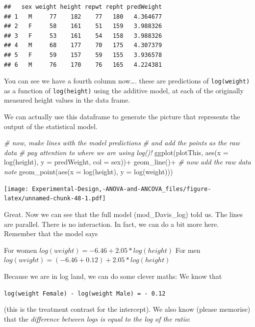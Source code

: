 \documentclass[
]{book}
\newenvironment{Shaded}{\begin{snugshade}}{\end{snugshade}}
\newcommand{\AttributeTok}[1]{\textcolor[rgb]{0.77,0.63,0.00}{#1}}
\newcommand{\CommentTok}[1]{\textcolor[rgb]{0.56,0.35,0.01}{\textit{#1}}}
\newcommand{\FunctionTok}[1]{\textcolor[rgb]{0.00,0.00,0.00}{#1}}
\newcommand{\NormalTok}[1]{#1}
\newcommand{\SpecialCharTok}[1]{\textcolor[rgb]{0.00,0.00,0.00}{#1}}
\begin{document}
\begin{verbatim}
##   sex weight height repwt repht predWeight
## 1   M     77    182    77   180   4.364677
## 2   F     58    161    51   159   3.988326
## 3   F     53    161    54   158   3.988326
## 4   M     68    177    70   175   4.307379
## 5   F     59    157    59   155   3.936578
## 6   M     76    170    76   165   4.224381
\end{verbatim}

You can see we have a fourth column now\ldots. these are predictions of \texttt{log(weight)} as a function of \texttt{log(height)} using the additive model, at each of the originally measured height values in the data frame.

We can actually use this dataframe to generate the picture that represents the output of the statistical model.

\begin{Shaded}
\begin{Highlighting}[]
\CommentTok{\# now, make lines with the model predictions}
\CommentTok{\# and add the points as the raw data}
\CommentTok{\# pay attention to where we are using log()!}
\FunctionTok{ggplot}\NormalTok{(plotThis, }\FunctionTok{aes}\NormalTok{(}\AttributeTok{x =} \FunctionTok{log}\NormalTok{(height), }\AttributeTok{y =}\NormalTok{ predWeight, }\AttributeTok{col =}\NormalTok{ sex))}\SpecialCharTok{+}
  \FunctionTok{geom\_line}\NormalTok{()}\SpecialCharTok{+}
  \CommentTok{\# now add the raw data note}
  \FunctionTok{geom\_point}\NormalTok{(}\FunctionTok{aes}\NormalTok{(}\AttributeTok{x =} \FunctionTok{log}\NormalTok{(height), }\AttributeTok{y =} \FunctionTok{log}\NormalTok{(weight)))}
\end{Highlighting}
\end{Shaded}

\texttt{[image: Experimental-Design,-ANOVA-and-ANCOVA\_files/figure-latex/unnamed-chunk-48-1.pdf]}

Great. Now we can see that the full model (mod\_Davis\_log) told us. The lines are parallel. There is no interaction. In fact, we can do a bit more here. Remember that the model says

For women \(log(weight)= -6.46 + 2.05 * log(height)\)
For men \(log(weight)= (-6.46 + 0.12) + 2.05 * log(height)\)

Because we are in log land, we can do some clever maths: We know that

\texttt{log(weight\ Female)\ -\ log(weight\ Male)\ =\ -\ 0.12}

(this is the treatment contrast for the intercept). We also know (please memorise) that the \emph{difference between logs is equal to the log of the ratio}:
\end{document}
